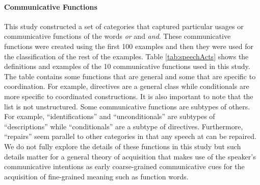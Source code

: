 \documentclass[floatsintext,man]{apa6}
\theoremstyle{definition}
\theoremstyle{definition}
\theoremstyle{definition}
\theoremstyle{remark}
\begin{document}
\paragraph{Communicative Functions}\label{communicative-functions}

This study constructed a set of categories that captured particular
usages or communicative functions of the words \emph{or} and \emph{and}.
These communicative functions were created using the first 100 examples
and then they were used for the classification of the rest of the
examples. Table \ref{tab:speechActs} shows the definitions and examples
of the 10 communicative functions used in this study. The table contains
some functions that are general and some that are specific to
coordination. For example, directives are a general class while
conditionals are more specific to coordinated constructions. It is also
important to note that the list is not unstructured. Some communicative
functions are subtypes of others. For example, \enquote{identifications}
and \enquote{unconditionals} are subtypes of \enquote{descriptions}
while \enquote{conditionals} are a subtype of directives. Furthermore,
\enquote{repairs} seem parallel to other categories in that any speech
at can be repaired. We do not fully explore the details of these
functions in this study but such details matter for a general theory of
acquisition that makes use of the speaker's communicative intentions as
early coarse-grained communicative cues for the acquisition of
fine-grained meaning such as function words.
\end{document}
